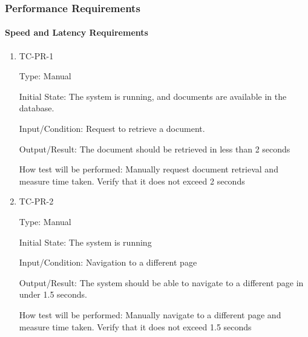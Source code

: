 \documentclass[12pt, titlepage]{article}
\begin{document}
\subsubsection{Performance Requirements}

\paragraph{Speed and Latency Requirements}

\begin{enumerate}
  \item {TC-PR-1\\}

    Type: Manual

    Initial State: The system is running, and documents are available in the
    database.

    Input/Condition: Request to retrieve a document.

    Output/Result: The document should be retrieved in less than 2 seconds

    How test will be performed: Manually request document retrieval and measure
    time taken. Verify that it does not exceed 2 seconds

  \item {TC-PR-2\\}

    Type: Manual

    Initial State: The system is running

    Input/Condition: Navigation to a different page

    Output/Result: The system should be able to navigate to a different page
    in under 1.5 seconds.

    How test will be performed: Manually navigate to a different page and
    measure time taken. Verify that it does not exceed 1.5 seconds

\end{enumerate}
\end{document}
